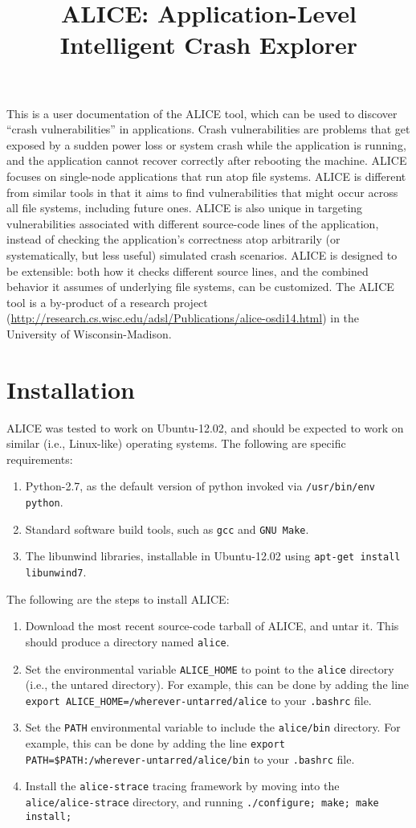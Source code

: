 \documentclass[oneside]{memoir}
\begin{document}
\title{ALICE: Application-Level Intelligent Crash Explorer}
\date{}
\maketitle

This is a user documentation of the ALICE tool, which can be used to discover ``crash vulnerabilities'' in applications. Crash vulnerabilities are problems that get exposed by a sudden power loss or system crash while the application is running, and the application cannot recover correctly after rebooting the machine. ALICE focuses on single-node applications that run atop file systems. ALICE is different from similar tools in that it aims to find vulnerabilities that might occur across all file systems, including future ones. ALICE is also unique in targeting vulnerabilities associated with different source-code lines of the application, instead of checking the application's correctness atop arbitrarily (or systematically, but less useful) simulated crash scenarios. ALICE is designed to be extensible: both how it checks different source lines, and the combined behavior it assumes of underlying file systems, can be customized. The ALICE tool is a by-product of a research project (\url{http://research.cs.wisc.edu/adsl/Publications/alice-osdi14.html}) in the University of Wisconsin-Madison.

\chapter{Installation}
ALICE was tested to work on Ubuntu-12.02, and should be expected to work on similar (i.e., Linux-like) operating systems. The following are specific requirements:
\begin{enumerate}
\item Python-2.7, as the default version of python invoked via \verb;/usr/bin/env python;.
\item Standard software build tools, such as \verb;gcc; and \verb;GNU Make;.
\item The libunwind libraries, installable in Ubuntu-12.02 using \verb;apt-get install libunwind7;.
\end{enumerate}
The following are the steps to install ALICE:
\begin{enumerate}
\item Download the most recent source-code tarball of ALICE, and untar it. This should produce a directory named \verb;alice;.
\item Set the environmental variable \verb;ALICE_HOME; to point to the \verb;alice; directory (i.e., the untared directory). For example, this can be done by adding the line \verb;export ALICE_HOME=/wherever-untarred/alice; to your \verb;.bashrc; file.
\item Set the \verb;PATH; environmental variable to include the \verb;alice/bin; directory. For example, this can be done by adding the line \verb;export PATH=$PATH:;\discretionary{}{}{}\verb;/wherever-untarred/alice/bin; to your \verb;.bashrc; file.
\item Install the \verb;alice-strace; tracing framework by moving into the \verb;alice/alice-strace; directory, and running \verb+./configure; make; make install;+
\end{enumerate}
\end{document}

